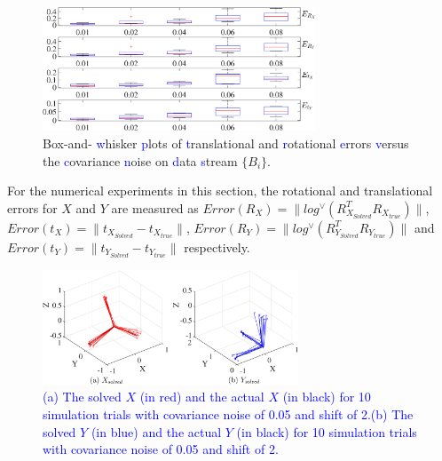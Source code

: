 \documentclass[letterpaper, 10 pt, conference]{ieeeconf}  %
\begin{document}
\begin{figure}[t!]
\centering
\includegraphics[width=3.2in]{fig3.eps}
\caption{
Box-and-%
\textcolor{blue}{w}hisker %
\textcolor{blue}{p}lots of %
\textcolor{blue}{t}ranslational and %
\textcolor{blue}{r}otational %
\textcolor{blue}{e}rrors %
\textcolor{blue}{v}ersus the %
\textcolor{blue}{c}ovariance %
\textcolor{blue}{n}oise on %
\textcolor{blue}{d}ata %
\textcolor{blue}{s}tream $\{B_i\}$.\vspace{6pt}
}
\label{fig3}
\end{figure}


For the numerical experiments in this section, the rotational and translational errors for $X$ and $Y$ are measured as  $Error(R_X) = \parallel log^{\vee} (R_{X_{Solved}}^{T}R_{X_{true}})\parallel$, $Error(t_X) = \parallel t_{X_{Solved}}-t_{X_{true}} \parallel$, $Error(R_Y) = \parallel log^{\vee} (R_{Y_{Solved}}^{T}R_{Y_{true}})\parallel$ and $Error(t_Y) = \parallel t_{Y_{Solved}}-t_{Y_{true}} \parallel$ respectively.

\begin{figure}[t!]
\centering
\includegraphics[width=3in]{fig4.eps}
\caption{
\textcolor{blue}{(a) The solved $X$ (in red) and the actual $X$ (in black) for 10 simulation trials with covariance noise of 0.05 and shift of 2.(b) The solved $Y$ (in blue) and the actual $Y$ (in black) for 10 simulation trials with covariance noise of 0.05 and shift of 2.}
}
\label{fig4}
\end{figure}
\end{document}

